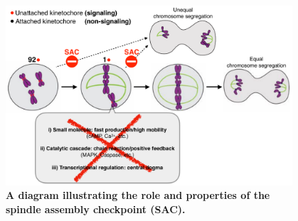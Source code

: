 





\begin{figure}
    \centering
    \includegraphics[width=0.95\textwidth]{chapters/figures/SACRole.pdf}
    \caption{\textbf{A diagram illustrating the role and properties of the spindle assembly checkpoint (SAC).}}
    \label{SACRole}
\end{figure}

